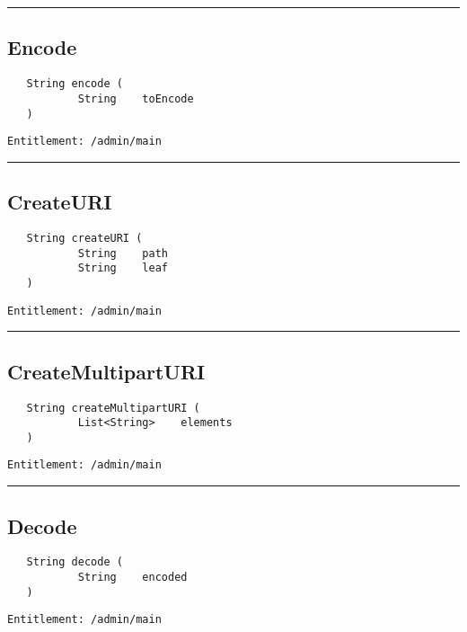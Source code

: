 \rule{12cm}{2pt}
\subsection{Encode}
\label{Api:Encode}
\begin{verbatim}
   String encode (
           String    toEncode
   )
\end{verbatim}
\begin{Verbatim}[fontsize=\small, formatcom=\color{Maroon}]
  Entitlement: /admin/main
\end{Verbatim}



\rule{12cm}{2pt}
\subsection{CreateURI}
\label{Api:CreateURI}
\begin{verbatim}
   String createURI (
           String    path
           String    leaf
   )
\end{verbatim}
\begin{Verbatim}[fontsize=\small, formatcom=\color{Maroon}]
  Entitlement: /admin/main
\end{Verbatim}



\rule{12cm}{2pt}
\subsection{CreateMultipartURI}
\label{Api:CreateMultipartURI}
\begin{verbatim}
   String createMultipartURI (
           List<String>    elements
   )
\end{verbatim}
\begin{Verbatim}[fontsize=\small, formatcom=\color{Maroon}]
  Entitlement: /admin/main
\end{Verbatim}



\rule{12cm}{2pt}
\subsection{Decode}
\label{Api:Decode}
\begin{verbatim}
   String decode (
           String    encoded
   )
\end{verbatim}
\begin{Verbatim}[fontsize=\small, formatcom=\color{Maroon}]
  Entitlement: /admin/main
\end{Verbatim}



